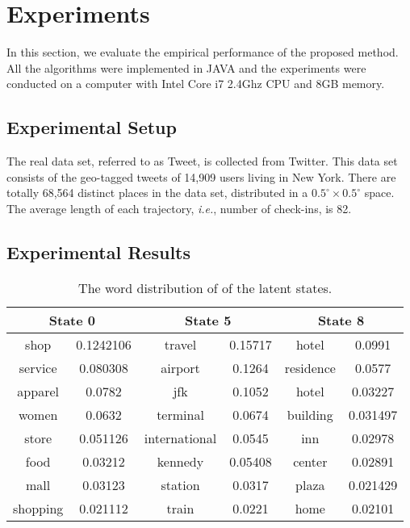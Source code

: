 
\section{Experiments}
\label{sect:exp}

In this section, we evaluate the empirical performance of the proposed method. All
the algorithms were implemented in JAVA and the experiments were conducted on a
computer with Intel Core i7 2.4Ghz CPU and 8GB memory.


\subsection{Experimental Setup}
\label{sect:setup}


 The real data set, referred to as Tweet, is collected from
Twitter.  This data set consists of the geo-tagged tweets of 14,909 users
living in New York.  There are totally 68,564 distinct places in the data set,
distributed in a $0.5^{\circ} \times 0.5^{\circ}$ space. The average length of
each trajectory, \emph{i.e.}, number of check-ins, is 82.



\subsection{Experimental Results}
\label{sect:results}



\begin{table*}[t]
\centering
\caption{The word distribution of of the latent states.}
\label{tab:result}
\begin{small}
\begin{tabular}{|c|c|c|c|c|c|}
\hline
\multicolumn{2}{|c|}{\textbf{State 0}} & \multicolumn{2}{|c|}{\textbf{State 5}} & \multicolumn{2}{|c|}{\textbf{State 8}} \\ \hline\hline
shop & 0.1242106& travel & 0.15717 & hotel & 0.0991\\\hline
service & 0.080308& airport & 0.1264 & residence & 0.0577\\\hline
apparel & 0.0782& jfk & 0.1052 & hotel & 0.03227\\\hline
women & 0.0632 & terminal & 0.0674 & building & 0.031497\\\hline
store & 0.051126& international & 0.0545 & inn & 0.02978\\\hline
food & 0.03212 & kennedy & 0.05408 & center & 0.02891\\\hline
mall & 0.03123 & station & 0.0317 & plaza & 0.021429\\\hline
shopping & 0.021112 & train & 0.0221 & home & 0.02101\\\hline
\end{tabular}
\end{small}
\end{table*}





